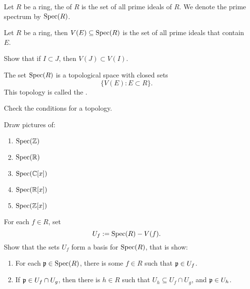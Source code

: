 \documentclass{ximera}
\begin{document}
\begin{definition}
  Let $R$ be a ring, the  of $R$ is the set of all
  prime ideals of $R$. We denote the prime spectrum by $\operatorname{Spec}(R)$.
\end{definition}

\begin{definition}
  Let $R$ be a ring, then $V(E)\subseteq \operatorname{Spec}(R)$ is the set of all
  prime ideals that contain $E$.
\end{definition}

\begin{exercise}
  Show that if $I\subset J$, then $V(J) \subset V(I)$.
\end{exercise}

\begin{proposition}
  The set $\operatorname{Spec}(R)$ is a topological space with closed sets
  \[
  \{ V(E):E\subset R\}.
  \]
  This topology is called the .
  \begin{sketch}
    Check the conditions for a topology.
  \end{sketch}
\end{proposition}

\begin{exercise}%
  Draw pictures of:
  \begin{enumerate}
  \item $\operatorname{Spec}(\mathbb Z)$
  \item $\operatorname{Spec}(\mathbb R)$
  \item $\operatorname{Spec}(\mathbb C[x])$
  \item $\operatorname{Spec}(\mathbb R[x])$
  \item $\operatorname{Spec}(\mathbb Z[x])$
  \end{enumerate}
\end{exercise}


\begin{exercise}
  For each $f\in R$, set
  \[
  U_f := \operatorname{Spec}(R) - V(f).
  \]
  Show that the sets $U_f$ form a basis for $\operatorname{Spec}(R)$, that is show:
  \begin{enumerate}
    \item For each $\mathfrak{p}\in\operatorname{Spec}(R)$, there is some $f\in R$ such that
      $\mathfrak{p}\in U_f$.
    \item If $\mathfrak{p}\in U_f \cap U_g$, then there is $h\in R$ such that
      $U_h\subseteq U_f\cap U_g$, and $\mathfrak{p}\in U_h$.
  \end{enumerate}
\end{exercise}
\end{document}
